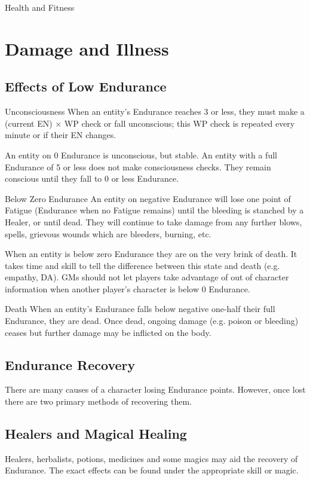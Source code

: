 \begin{Chapter}{Health and Fitness}
\section{Damage and Illness}

\subsection{Effects of Low Endurance}

Unconsciousness When an entity’s Endurance reaches 3 or less, they
must make a (current EN) × WP check or fall unconscious; this WP check
is repeated every minute or if their EN changes.

An entity on 0 Endurance is unconscious, but stable.  An entity with a
full Endurance of 5 or less does not make consciousness checks. They
remain conscious until they fall to 0 or less Endurance.

Below Zero Endurance An entity on negative Endurance will lose one
point of Fatigue (Endurance when no Fatigue remains) until the
bleeding is stanched by a Healer, or until dead.  They will continue
to take damage from any further blows, spells, grievous wounds which
are bleeders, burning, etc.

When an entity is below zero Endurance they are on the very brink of
death. It takes time and skill to tell the difference between this
state and death (e.g.  empathy, DA).  GMs should not let players take
advantage of out of character information when another player’s
character is below 0 Endurance.

Death When an entity’s Endurance falls below negative one-half their
full Endurance, they are dead.  Once dead, ongoing damage (e.g.
poison or bleeding) ceases but further damage may be inflicted on the
body.

\subsection{Endurance Recovery}

There are many causes of a character losing Endurance points.
However, once lost there are two primary methods of recovering them.

\subsection{Healers and Magical Healing}

Healers, herbalists, potions, medicines and some magics may aid the
recovery of Endurance.  The exact effects can be found under the
appropriate skill or magic.


\end{Chapter}
